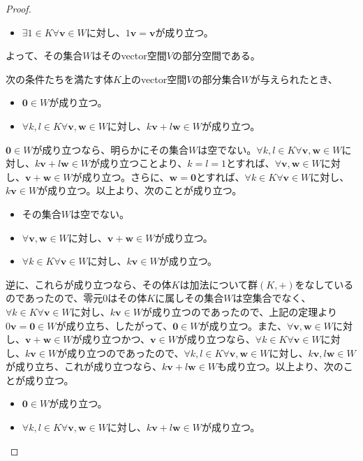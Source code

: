 \documentclass[dvipdfmx]{jsarticle}
\begin{document}
\begin{proof}
\begin{itemize}
\item
  $\exists 1 \in K\forall\mathbf{v} \in W$に対し、$1\mathbf{v} = \mathbf{v}$が成り立つ。
\end{itemize}
よって、その集合$W$はそのvector空間$V$の部分空間である。\par
次の条件たちを満たす体$K$上のvector空間$V$の部分集合$W$が与えられたとき、
\begin{itemize}
\item
  $\mathbf{0} \in W$が成り立つ。
\item
  $\forall k,l \in K\forall\mathbf{v},\mathbf{w} \in W$に対し、$k\mathbf{v} + l\mathbf{w} \in W$が成り立つ。
\end{itemize}
$\mathbf{0} \in W$が成り立つなら、明らかにその集合$W$は空でない。$\forall k,l \in K\forall\mathbf{v},\mathbf{w} \in W$に対し、$k\mathbf{v} + l\mathbf{w} \in W$が成り立つことより、$k = l = 1$とすれば、$\forall\mathbf{v},\mathbf{w} \in W$に対し、$\mathbf{v} + \mathbf{w} \in W$が成り立つ。さらに、$\mathbf{w} = \mathbf{0}$とすれば、$\forall k \in K\forall\mathbf{v} \in W$に対し、$k\mathbf{v} \in W$が成り立つ。以上より、次のことが成り立つ。
\begin{itemize}
\item
  その集合$W$は空でない。
\item
  $\forall\mathbf{v},\mathbf{w} \in W$に対し、$\mathbf{v} + \mathbf{w} \in W$が成り立つ。
\item
  $\forall k \in K\forall\mathbf{v} \in W$に対し、$k\mathbf{v} \in W$が成り立つ。
\end{itemize}\par
逆に、これらが成り立つなら、その体$K$は加法について群$(K, + )$をなしているのであったので、零元$0$はその体$K$に属しその集合$W$は空集合でなく、$\forall k \in K\forall\mathbf{v} \in W$に対し、$k\mathbf{v} \in W$が成り立つのであったので、上記の定理より$0\mathbf{v} = \mathbf{0} \in W$が成り立ち、したがって、$\mathbf{0} \in W$が成り立つ。また、$\forall\mathbf{v},\mathbf{w} \in W$に対し、$\mathbf{v} + \mathbf{w} \in W$が成り立つかつ、$\mathbf{v} \in W$が成り立つなら、$\forall k \in K\forall\mathbf{v} \in W$に対し、$k\mathbf{v} \in W$が成り立つのであったので、$\forall k,l \in K\forall\mathbf{v},\mathbf{w} \in W$に対し、$k\mathbf{v},l\mathbf{w} \in W$が成り立ち、これが成り立つなら、$k\mathbf{v} + l\mathbf{w} \in W$も成り立つ。以上より、次のことが成り立つ。
\begin{itemize}
\item
  $\mathbf{0} \in W$が成り立つ。
\item
  $\forall k,l \in K\forall\mathbf{v},\mathbf{w} \in W$に対し、$k\mathbf{v} + l\mathbf{w} \in W$が成り立つ。
\end{itemize}
\end{proof}
\end{document}
